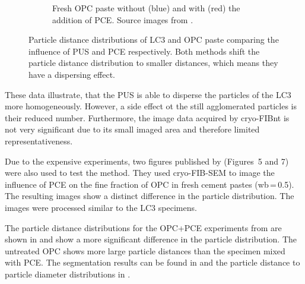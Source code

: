 \begin{figure}[H]
\begin{subfigure}[t]{0.495\textwidth}
		\caption{
            Fresh \ac{OPC} paste {\color{blue}without} (blue) and {\color{red}with} (red) the addition of \acs*{PCE}.
		    Source images from \cite{zingg.2008a}.
        }
		\label{fig:cryo-fib-results_2b}
	\end{subfigure}

    \caption{
		Particle distance distributions of \acs*{LC3} and \acs*{OPC} paste comparing the influence of \acs*{PUS} and \acs*{PCE} respectively.
		Both methods shift the particle distance distribution to smaller distances, which means they have a dispersing effect.
    }
    \label{fig:cryo-fib-results_2}
\end{figure}

These data illustrate, that the \ac{PUS} is able to disperse the particles of the \ac{LC3} more homogeneously.
However, a side effect ot the still agglomerated particles is their reduced number.
Furthermore, the image data acquired by cryo-\ac{FIBnt} is not very significant due to its small imaged area and therefore limited representativeness.

Due to the expensive experiments, two figures published by \textcite{zingg.2008a} (Figures~\num{5} and \num{7}) were also used to test the method.
They used cryo-\ac{FIB}-\ac{SEM} to image the influence of \ac{PCE} on the fine fraction of \ac{OPC} in fresh cement pastes (\ac{wb}\,=\,\num{0.5}).
The resulting images show a distinct difference in the particle distribution.
The images were processed similar to the \ac{LC3} specimens.

The particle distance distributions for the \ac{OPC}+\ac{PCE} experiments from \textcite{zingg.2008a} are shown in  and show a more significant difference in the particle distribution.
The untreated \ac{OPC} shows more large particle distances than the specimen mixed with \ac{PCE}.
The segmentation results can be found in  and the particle distance to particle diameter distributions in .

